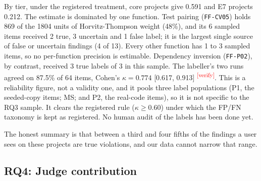\documentclass[10pt,a4paper]{article}
\newcommand{\citeneeded}[1]{\cite{#1}\textsuperscript{\textcolor{red}{\tiny[verify]}}}
\newcommand{\ff}[1]{\texttt{\small #1}}
\begin{document}
By tier, under the registered treatment, core projects give 0.591 and E7 projects 0.212.
The estimate is dominated by one function. Test pairing (\ff{FF-CV05}) holds 869 of the 1804 units of
Horvitz-Thompson weight (48\%), and its 6 sampled items received 2 true, 3 uncertain and 1 false label; it is the
largest single source of false or uncertain findings (4 of 13). Every other function has 1 to 3 sampled items, so
no per-function precision is estimable. Dependency inversion (\ff{FF-P02}), by contrast, received 3 true labels of
3 in this sample. %
The labeller's two runs agreed on 87.5\% of 64 items, Cohen's $\kappa = 0.774$ [0.617, 0.913]
\citeneeded{cohen1960}. This is a reliability figure, not a validity one, and it pools three label populations (P1,
the seeded-copy items; MS; and P2, the real-code items), so it is not specific to the RQ3 sample. It clears the
registered rule ($\kappa \geq 0.60$) under which the FP/FN taxonomy is kept as registered. No human audit of the
labels has been done yet. %

The honest summary is that between a third and four fifths of the findings a user sees on these projects are true
violations, and our data cannot narrow that range.

\subsection{RQ4: Judge contribution}\label{sec:rq4}
\end{document}
